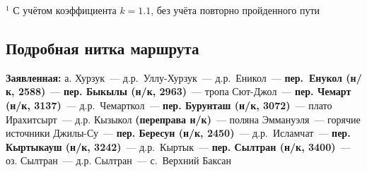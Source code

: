 \begin{table}[h!]
\end{table}
\footnotesize{$^1$ С учётом коэффициента $k=1.1$, без учёта повторно пройденного пути}
\normalsize

\subsection{Подробная нитка маршрута}
\textbf{Заявленная:} а. Хурзук~--- д.р.~Уллу-Хурзук~--- д.р.~Еникол~--- \textbf{пер.~Енукол (н/к, 2588)}~--- \textbf{пер. Быкылы (н/к, 2963)}~--- тропа Сют-Джол~--- \textbf{пер. Чемарт (н/к, 3137)}~--- д.р.~Чемарткол~--- \textbf{пер. Бурунташ (н/к, 3072)}~--- плато Ирахитсырт~--- д.р. Кызыкол \textbf{(переправа н/к)}~--- поляна Эммануэля~--- горячие источники Джилы-Су~--- \textbf{пер. Бересун (н/к, 2450)}~--- д.р.~Исламчат~---\textbf{ пер. Кыртыкауш (н/к, 3242)}~--- д.р.~Кыртык~---\textbf{ пер. Сылтран (н/к, 3400)}~--- оз. Сылтран~--- д.р. Сылтран~--- с.~Верхний Баксан

